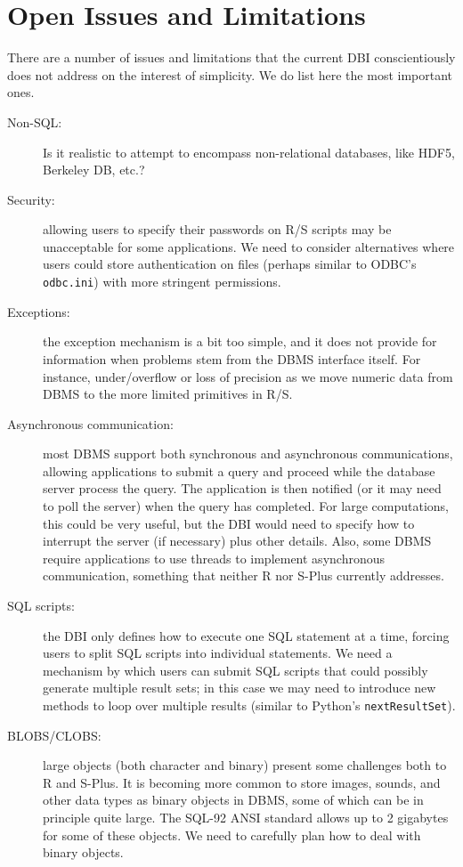\documentclass{article}
\begin{document}
\section{Open Issues and Limitations}\label{sec:open-issues}
There are a number of issues and limitations that the current
DBI conscientiously does not address on the interest of simplicity.
We do list here the most important ones.
\begin{description}
\item[Non-SQL:]
  Is it realistic to attempt to encompass non-relational databases,
  like HDF5, Berkeley DB, etc.?

\item[Security:] 
  allowing users to specify their passwords on R/S scripts may
  be unacceptable for some applications.  We need to consider
  alternatives where users could store authentication on files
  (perhaps similar to ODBC's \texttt{odbc.ini}) with more stringent 
  permissions.

\item[Exceptions:]
  the exception mechanism is a bit too simple, and it does not
  provide for information when problems stem from the DBMS
  interface itself.  For instance, under/overflow or loss of
  precision as we move numeric data from DBMS to the more limited
  primitives in R/S.

\item[Asynchronous communication:]
  most DBMS support both synchronous and asynchronous communications,
  allowing applications to submit a query and proceed while
  the database server process the query. The application is then
  notified (or it may need to poll the server) when the query has completed.
  For large computations, this could be very useful, but the DBI
  would need to specify how to interrupt the server (if necessary)
  plus other details.  Also, some DBMS require applications to use
  threads to implement asynchronous communication, something that
  neither R nor S-Plus currently addresses.

\item[SQL scripts:]
  the DBI only defines how to execute one SQL statement at a time, 
  forcing users to split SQL scripts into individual statements.
  We need a mechanism by which users can submit SQL scripts that
  could possibly generate multiple result sets;  in this case we 
  may need to introduce new methods to loop over multiple results
  (similar to Python's \texttt{nextResultSet}).

\item[BLOBS/CLOBS:]
  large objects (both character and binary) present some challenges both
  to R and S-Plus.  It is becoming more common to store images, sounds,
  and other data types as binary objects in DBMS, some of which can
  be in principle quite large. The SQL-92 ANSI standard allows up
  to 2 gigabytes for some of these objects.  We need to carefully
  plan how to deal with binary objects.
  

\end{description}
\end{document}
